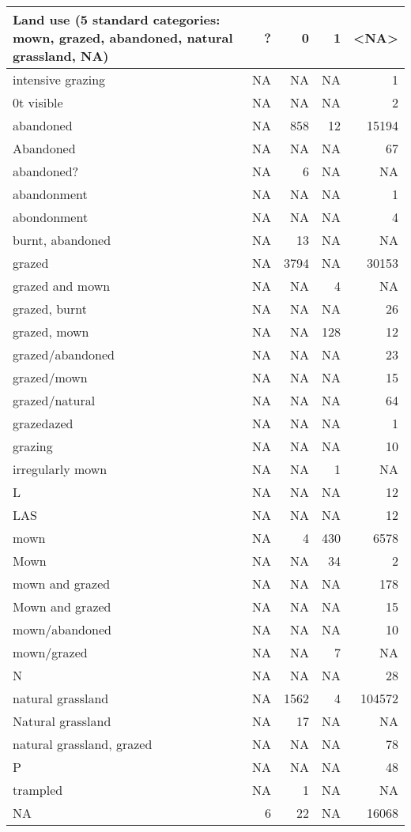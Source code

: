\documentclass[table]{article}
\begin{document}
\begin{tabular}{>{\raggedright\arraybackslash}p{8cm}|r|r|r|r}
\hline
Land use (5 standard categories: mown, grazed, abandoned, natural grassland, NA) & ? & 0 & 1 & <NA>\\
\hline
0 intensive grazing & NA & NA & NA & 1\\
\hline
0t visible & NA & NA & NA & 2\\
\hline
abandoned & NA & 858 & 12 & 15194\\
\hline
Abandoned & NA & NA & NA & 67\\
\hline
abandoned? & NA & 6 & NA & NA\\
\hline
abandonment & NA & NA & NA & 1\\
\hline
abondonment & NA & NA & NA & 4\\
\hline
burnt, abandoned & NA & 13 & NA & NA\\
\hline
grazed & NA & 3794 & NA & 30153\\
\hline
grazed and mown & NA & NA & 4 & NA\\
\hline
grazed, burnt & NA & NA & NA & 26\\
\hline
grazed, mown & NA & NA & 128 & 12\\
\hline
grazed/abandoned & NA & NA & NA & 23\\
\hline
grazed/mown & NA & NA & NA & 15\\
\hline
grazed/natural & NA & NA & NA & 64\\
\hline
grazedazed & NA & NA & NA & 1\\
\hline
grazing & NA & NA & NA & 10\\
\hline
irregularly mown & NA & NA & 1 & NA\\
\hline
L & NA & NA & NA & 12\\
\hline
LAS & NA & NA & NA & 12\\
\hline
mown & NA & 4 & 430 & 6578\\
\hline
Mown & NA & NA & 34 & 2\\
\hline
mown and grazed & NA & NA & NA & 178\\
\hline
Mown and grazed & NA & NA & NA & 15\\
\hline
mown/abandoned & NA & NA & NA & 10\\
\hline
mown/grazed & NA & NA & 7 & NA\\
\hline
N & NA & NA & NA & 28\\
\hline
natural grassland & NA & 1562 & 4 & 104572\\
\hline
Natural grassland & NA & 17 & NA & NA\\
\hline
natural grassland, grazed & NA & NA & NA & 78\\
\hline
P & NA & NA & NA & 48\\
\hline
trampled & NA & 1 & NA & NA\\
\hline
NA & 6 & 22 & NA & 16068\\
\hline
\end{tabular}
\end{document}
